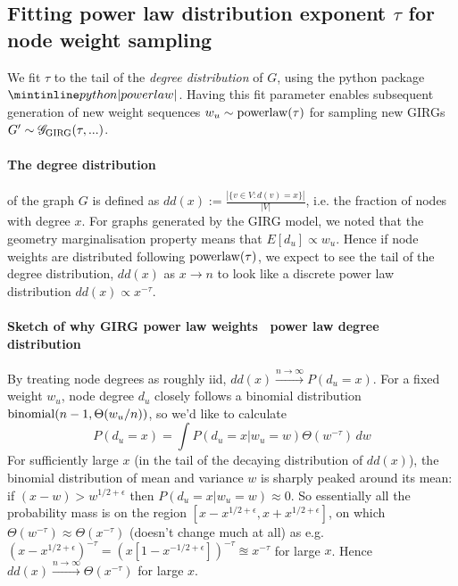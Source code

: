 


\subsection{Fitting power law distribution exponent $\tau$ for node weight sampling}
We fit $\tau$ to the tail of the \textit{degree distribution} of $G$, using the python package $\PLP$. Having this fit parameter enables subsequent generation of new weight sequences $w_u \sim \operatorname{powerlaw}(\tau)$ for sampling new GIRGs $G' \sim \mathscr{G}_{\mathrm{GIRG}}(\tau,...)$.

\paragraph{The degree distribution} of the graph $G$ is defined as $dd(x) := \frac{|\{v \in V: d(v) = x\}|}{|V|}$, i.e. the fraction of nodes with degree $x$. For graphs generated by the GIRG model, we noted that the geometry marginalisation property means that $E[d_u] \propto w_u$. Hence if node weights are distributed following $\operatorname{powerlaw}(\tau)$, we expect to see the tail of the degree distribution, $dd(x)$ as $x \to n$ to look like a discrete power law distribution $dd(x) \propto x^{-\tau}$.

\paragraph{Sketch of why GIRG power law weights \textrightarrow\ power law degree distribution}  
By treating node degrees as roughly iid, $dd(x) \stackrel{n \to \infty}{\to} P(d_u = x)$.
For a fixed weight $w_u$, node degree $d_u$ closely follows a binomial distribution $\operatorname{binomial}(n-1, \Theta(w_u / n))$, so we'd like to calculate 
\begin{equation}
    P(d_u = x) = \int P(d_u = x | w_u = w) \Theta(w^{-\tau}) \,dw
\end{equation}
For sufficiently large $x$ (in the tail of the decaying distribution of $dd(x)$), the binomial distribution of mean and variance $w$ is sharply peaked around its mean: if $(x-w) > w^{1/2 + \epsilon}$ then $P(d_u = x | w_u = w) \approx 0$. 
So essentially all the probability mass is on the region $[x - x^{1/2 + \epsilon}, x + x^{1/2 + \epsilon}]$, on which $\Theta(w^{-\tau}) \approx \Theta(x^{-\tau})$ (doesn't change much at all) as e.g. $(x - x^{1/2 + \epsilon})^{-\tau} = (x[1 - x^{-1/2 + \epsilon}])^{-\tau} \approxeq x^{-\tau}$ for large $x$.
Hence $dd(x) \stackrel{n \to \infty}{\to} \Theta(x^{-\tau})$ for large $x$.


